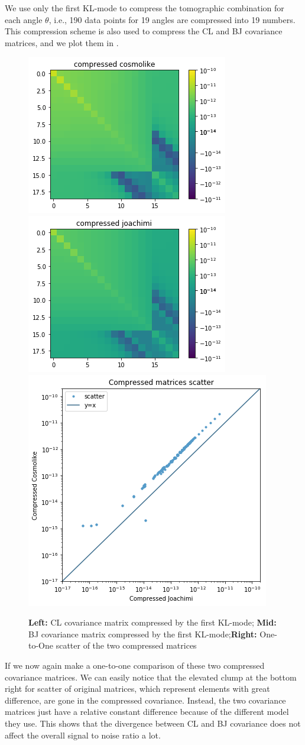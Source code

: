 \documentclass[twocolumn]{\docclass}
\begin{document}
	We use only the first KL-mode to compress the tomographic combination for each angle $\theta$, i.e., 190 data points for 19 angles are compressed into 19 numbers.  This compression scheme is also used to compress the CL and BJ covariance matrices, and we plot them in .
	
	\begin{figure}
		\includegraphics[width=0.34\columnwidth]{kl_comp_cl.png}
		\includegraphics[width=0.34\columnwidth]{kl_comp_bj.png}
		\includegraphics[width=0.27\columnwidth]{kl_scatter.png}
		\caption{\textbf{Left:} CL covariance matrix compressed by the first KL-mode; \textbf{Mid:} BJ covariance matrix compressed by the first KL-mode;\textbf{Right:} One-to-One scatter of the two compressed matrices \label{fig:comp-cov}}
	\end{figure}
	
	If we now again make a one-to-one comparison of these two compressed covariance matrices. We can easily notice that the elevated clump at the bottom right for scatter of original matrices, which represent elements with great difference, are gone in the compressed covariance. Instead, the two covariance matrices just have a relative constant difference because of the different model they use. This shows that the divergence between CL and BJ covariance does not affect the overall signal to noise ratio a lot.
	
\end{document}

